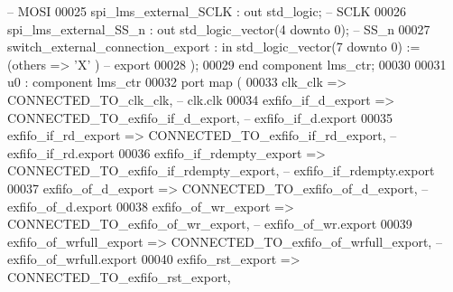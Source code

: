 \begin{DoxyCode}
         \textcolor{keyword}{-- MOSI}
00025             spi_lms_external_SCLK                   : \textcolor{keywordflow}{out}   \textcolor{comment}{std\_logic};                                     
         \textcolor{keyword}{-- SCLK}
00026             spi_lms_external_SS_n                   : \textcolor{keywordflow}{out}   \textcolor{comment}{std\_logic\_vector}(\textcolor{vhdllogic}{}\textcolor{vhdllogic}{4} \textcolor{keywordflow}{downto} \textcolor{vhdllogic}{}\textcolor{vhdllogic}{0});                  
         \textcolor{keyword}{-- SS\_n}
00027             switch_external_connection_export       : \textcolor{keywordflow}{in}    \textcolor{comment}{std\_logic\_vector}(\textcolor{vhdllogic}{}\textcolor{vhdllogic}{7} \textcolor{keywordflow}{downto} \textcolor{vhdllogic}{}\textcolor{vhdllogic}{0})  := (\textcolor{keywordflow}{others} => 'X'
      )\textcolor{keyword}{  -- export}
00028         );
00029     \textcolor{keywordflow}{end} \textcolor{keywordflow}{component} \textcolor{vhdlchar}{lms\_ctr};
00030 
00031     u0 : \textcolor{keywordflow}{component} lms_ctr
00032         \textcolor{keywordflow}{port} \textcolor{keywordflow}{map} (
00033             clk_clk                                 => CONNECTED\_TO\_clk\_clk,\textcolor{keyword}{                               
        --                              clk.clk}
00034             exfifo_if_d_export                      => CONNECTED\_TO\_exfifo\_if\_d\_export,\textcolor{keyword}{                    
        --                      exfifo\_if\_d.export}
00035             exfifo_if_rd_export                     => CONNECTED\_TO\_exfifo\_if\_rd\_export,\textcolor{keyword}{                   
        --                     exfifo\_if\_rd.export}
00036             exfifo_if_rdempty_export                => CONNECTED\_TO\_exfifo\_if\_rdempty\_export,\textcolor{keyword}{              
        --                exfifo\_if\_rdempty.export}
00037             exfifo_of_d_export                      => CONNECTED\_TO\_exfifo\_of\_d\_export,\textcolor{keyword}{                    
        --                      exfifo\_of\_d.export}
00038             exfifo_of_wr_export                     => CONNECTED\_TO\_exfifo\_of\_wr\_export,\textcolor{keyword}{                   
        --                     exfifo\_of\_wr.export}
00039             exfifo_of_wrfull_export                 => CONNECTED\_TO\_exfifo\_of\_wrfull\_export,\textcolor{keyword}{               
        --                 exfifo\_of\_wrfull.export}
00040             exfifo_rst_export                       => CONNECTED\_TO\_exfifo\_rst\_export,\textcolor{keyword}{                     
}
\end{DoxyCode}
